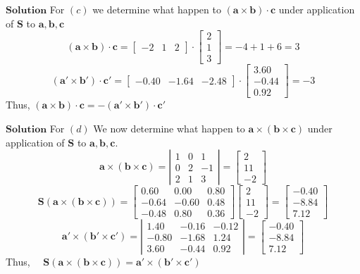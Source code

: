 $\boxed{\textbf{Solution}}$ For $(c)
$ we determine what happen to $(\mathbf{a} \times \mathbf{b}) \cdot \mathbf{c}$ under application of $\mathbf{S}$ to $\mathbf{a}, \mathbf{b}, \mathbf{c}$
$$
(\mathbf{a} \times \mathbf{b}) \cdot \mathbf{c}=\begin{bmatrix}
-2 & 1 & 2
\end{bmatrix} \cdot\begin{bmatrix}
2 \\
1 \\
3
\end{bmatrix}=-4+1+6=3
$$
$$
\left(\mathbf{a}' \times \mathbf{b}'\right) \cdot \mathbf{c}'=\begin{bmatrix}
-0.40 & -1.64 & -2.48
\end{bmatrix} \cdot\begin{bmatrix}
3.60 \\
-0.44 \\
0.92
\end{bmatrix}=-3
$$
Thus, $(\mathbf{a} \times \mathbf{b}) \cdot \mathbf{c}=-\left(\mathbf{a}' \times \mathbf{b}'\right) \cdot \mathbf{c}'$




$\boxed{\textbf{Solution}}$ For $(d)$ We now determine what happen to $\mathbf{a}\times(\mathbf{b} \times \mathbf{c})$ under application of $\mathbf{S}$ to $\mathbf{a}, \mathbf{b}, \mathbf{c}$.
$$
\mathbf{a}\times(\mathbf{b} \times \mathbf{c})=\left|\begin{array}{ccc}
1 & 0 & 1 \\
0 & 2 & -1 \\
2 & 1 & 3
\end{array}\right|=\begin{bmatrix}
2 \\
11 \\
-2
\end{bmatrix}
$$
$$
\mathbf{S}(\mathbf{a}\times(\mathbf{b} \times \mathbf{c}))=\begin{bmatrix}
0.60 & 0.00 & 0.80 \\
-0.64 & -0.60 & 0.48 \\
-0.48 & 0.80 & 0.36
\end{bmatrix}\begin{bmatrix}
2 \\
11 \\
-2
\end{bmatrix}=\begin{bmatrix}
-0.40 \\
-8.84 \\
7.12
\end{bmatrix}
$$
$$
\mathbf{a}' \times\left(\mathbf{b}' \times \mathbf{c}'\right)=\left|\begin{array}{ccc}
1.40 & -0.16 & -0.12 \\
-0.80 & -1.68 & 1.24 \\
3.60 & -0.44 & 0.92
\end{array}\right|=\begin{bmatrix}
-0.40 \\
-8.84 \\
7.12
\end{bmatrix}
$$
Thus, $\quad \mathbf{S}(\mathbf{a}\times(\mathbf{b} \times \mathbf{c}))=\mathbf{a}' \times\left(\mathbf{b}' \times \mathbf{c}'\right)$



